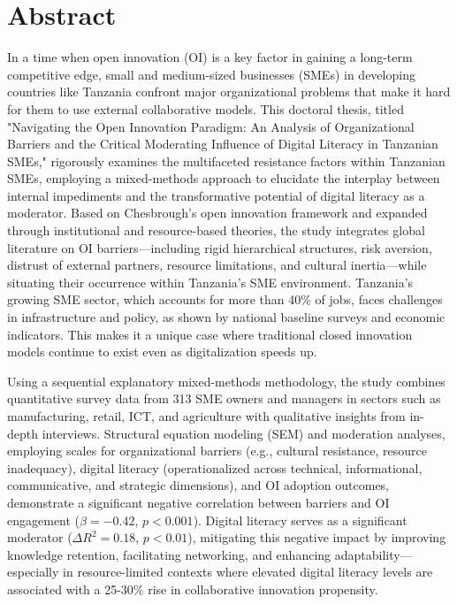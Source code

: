 \section*{Abstract}

In a time when open innovation (OI) is a key factor in gaining a long-term competitive edge, small and medium-sized businesses (SMEs) in developing countries like Tanzania confront major organizational problems that make it hard for them to use external collaborative models. This doctoral thesis, titled "Navigating the Open Innovation Paradigm: An Analysis of Organizational Barriers and the Critical Moderating Influence of Digital Literacy in Tanzanian SMEs," rigorously examines the multifaceted resistance factors within Tanzanian SMEs, employing a mixed-methods approach to elucidate the interplay between internal impediments and the transformative potential of digital literacy as a moderator. Based on Chesbrough's open innovation framework and expanded through institutional and resource-based theories, the study integrates global literature on OI barriers—including rigid hierarchical structures, risk aversion, distrust of external partners, resource limitations, and cultural inertia—while situating their occurrence within Tanzania's SME environment. Tanzania's growing SME sector, which accounts for more than 40\% of jobs, faces challenges in infrastructure and policy, as shown by national baseline surveys and economic indicators. This makes it a unique case where traditional closed innovation models continue to exist even as digitalization speeds up.

Using a sequential explanatory mixed-methods methodology, the study combines quantitative survey data from 313 SME owners and managers in sectors such as manufacturing, retail, ICT, and agriculture with qualitative insights from in-depth interviews. Structural equation modeling (SEM) and moderation analyses, employing scales for organizational barriers (e.g., cultural resistance, resource inadequacy), digital literacy (operationalized across technical, informational, communicative, and strategic dimensions), and OI adoption outcomes, demonstrate a significant negative correlation between barriers and OI engagement ($\beta = -0.42$, $p < 0.001$). Digital literacy serves as a significant moderator ($\Delta R^2 = 0.18$, $p < 0.01$), mitigating this negative impact by improving knowledge retention, facilitating networking, and enhancing adaptability—especially in resource-limited contexts where elevated digital literacy levels are associated with a 25-30\% rise in collaborative innovation propensity.

